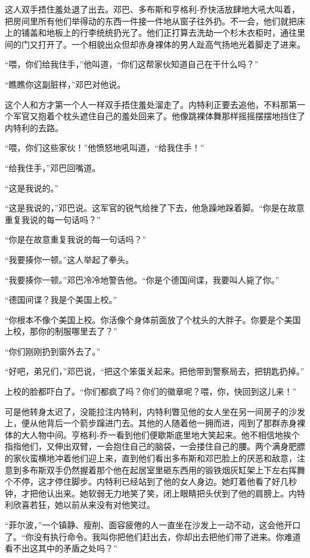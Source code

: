     这人双手捂住羞处退了出去。邓巴、多布斯和亨格利-乔快活放肆地大吼大叫着，把房间里所有他们举得动的东西一件接一件地从窗子往外扔。不一会，他们就把床上的铺盖和地板上的行李统统扔光了。他们正打算去洗劫一个杉木衣柜时，通往里间的门又打开了。一个相貌出众但却赤身裸体的男人趾高气扬地光着脚走了进来。

    “喂，你们给我住手，”他叫道，“你们这帮家伙知道自己在干什么吗？”

    “瞧瞧你这副脏样，”邓巴对他说。

    这个人和方才第一个人一样双手捂住羞处溜走了。内特利正要去追他，不料那第一个军官又抱着个枕头遮住自己的羞处回来了。他像跳裸体舞那样摇摇摆摆地挡住了内特利的去路。

    “喂，你们这些家伙！”他愤怒地吼叫道，“给我住手！”

    “给我住手，”邓巴回嘴道。

    “这是我说的。”

    “这是我说的，”邓巴说。这军官的锐气给挫了下去，他急躁地跺着脚。“你是在故意重复我说的每一句话吗？”

    “你是在故意重复我说的每一句话吗？”

    “我要揍你一顿。”这人举起了拳头。

    “我要揍你一顿。”邓巴冷冷地警告他。“你是个德国间谍，我要叫人毙了你。”

    “德国间谍？我是个美国上校。”

    “你根本不像个美国上校。你活像个身体前面放了个枕头的大胖子。你要是个美国上校，那你的制服哪里去了？”

    “你们刚刚扔到窗外去了。”

    “好吧，弟兄们，”邓巴说，“把这个笨蛋关起来。把他带到警察局去，把钥匙扔掉。”

    上校的脸都吓白了。“你们都疯了吗？你们的徽章呢？喂，你，快回到这儿来！”

    可是他转身太迟了，没能拉注内特利，内特利瞥见他的女人坐在另一间房子的沙发上，便从他背后一个箭步蹿进门去。其他的人随着他一拥而进，闯到了那群赤身裸体的大人物中间。亨格利-乔一看到他们便歇斯底里地大笑起来。他不相信地挨个指指他们，又伸出双臂，一会抱住自己的脑袋，一会搂住自己的腰。两个满身肥膘的家伙蛮横地冲着他们迎上来，直到他们看出多布斯和邓巴脸上的厌恶和敌意，注意到多布斯双手仍然握着那个他在起居室里砸东西用的锻铁烟灰缸架上下左右挥舞个不停，这才停住脚步。内特利已经站到了他的女人身边。她盯着他看了好几秒钟，才把他认出来。她软弱无力地笑了笑，闭上眼睛把头伏到了他的肩膀上。内特利欣喜若狂，她以前从来没有对他笑过。

    “菲尔波，”一个镇静、瘦削、面容疲倦的人一直坐在沙发上一动不动，这会他开口了。“你没有执行命令。我叫你把他们赶出去，你却出去把他们带了进来。你难道看不出这其中的矛盾之处吗？”

